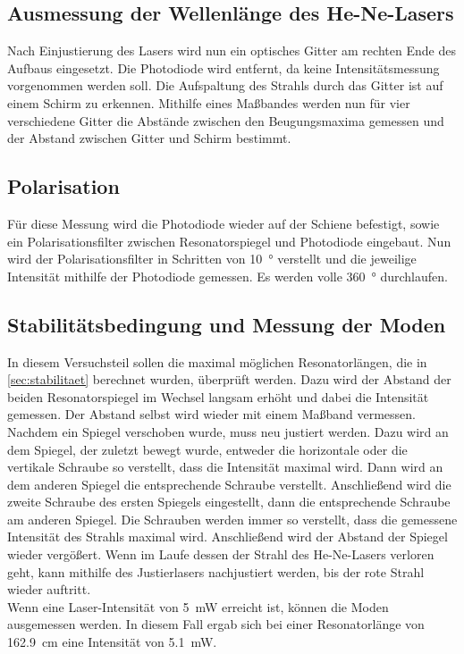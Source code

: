\subsection{Ausmessung der Wellenlänge des He-Ne-Lasers}

    Nach Einjustierung des Lasers wird nun ein optisches Gitter am rechten Ende des Aufbaus eingesetzt.
    Die Photodiode wird entfernt, da keine Intensitätsmessung vorgenommen werden soll.
    Die Aufspaltung des Strahls durch das Gitter ist auf einem Schirm zu erkennen.
    Mithilfe eines Maßbandes werden nun für vier verschiedene Gitter die Abstände zwischen den Beugungsmaxima gemessen
    und der Abstand zwischen Gitter und Schirm bestimmt.


\subsection{Polarisation}

    Für diese Messung wird die Photodiode wieder auf der Schiene befestigt,
    sowie ein Polarisationsfilter zwischen Resonatorspiegel und Photodiode eingebaut.
    Nun wird der Polarisationsfilter in Schritten von \SI{10}{\degree} verstellt und die jeweilige Intensität mithilfe der Photodiode gemessen.
    Es werden volle \SI{360}{\degree} durchlaufen.


\subsection{Stabilitätsbedingung und Messung der Moden}

    In diesem Versuchsteil sollen die maximal möglichen Resonatorlängen,
    die in \autoref{sec:stabilitaet} berechnet wurden,
    überprüft werden.
    Dazu wird der Abstand der beiden Resonatorspiegel im Wechsel langsam erhöht und dabei die Intensität gemessen.
    Der Abstand selbst wird wieder mit einem Maßband vermessen.
    Nachdem ein Spiegel verschoben wurde,
    muss neu justiert werden.
    Dazu wird an dem Spiegel,
    der zuletzt bewegt wurde,
    entweder die horizontale oder die vertikale Schraube so verstellt,
    dass die Intensität maximal wird.
    Dann wird an dem anderen Spiegel die entsprechende Schraube verstellt.
    Anschließend wird die zweite Schraube des ersten Spiegels eingestellt,
    dann die entsprechende Schraube am anderen Spiegel.
    Die Schrauben werden immer so verstellt,
    dass die gemessene Intensität des Strahls maximal wird.
    Anschließend wird der Abstand der Spiegel wieder vergößert.
    Wenn im Laufe dessen der Strahl des He-Ne-Lasers verloren geht,
    kann mithilfe des Justierlasers nachjustiert werden,
    bis der rote Strahl wieder auftritt.\\
    Wenn eine Laser-Intensität von \SI{5}{\milli\watt} erreicht ist,
    können die Moden ausgemessen werden.
    In diesem Fall ergab sich bei einer Resonatorlänge von \SI{162.9}{\centi\meter} eine Intensität von \SI{5.1}{\milli\watt}.


